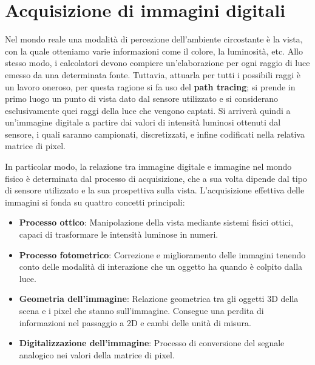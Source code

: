 \section{Acquisizione di immagini digitali}
Nel mondo reale una modalità di percezione dell'ambiente circostante è la vista, con la quale otteniamo varie informazioni come il colore, la luminosità,
etc. Allo stesso modo, i calcolatori devono compiere un'elaborazione per ogni raggio di luce emesso da una determinata fonte. Tuttavia, attuarla per
tutti i possibili raggi è un lavoro oneroso, per questa ragione si fa uso del \textbf{path tracing}; si prende in primo luogo un punto di vista dato dal
sensore utilizzato e si considerano esclusivamente quei raggi della luce che vengono captati. Si arriverà quindi a un'immagine digitale a partire dai
valori di intensità luminosi ottenuti dal sensore, i quali saranno campionati, discretizzati, e infine codificati nella relativa matrice di pixel.\par
In particolar modo, la relazione tra immagine digitale e immagine nel mondo fisico è determinata dal processo di acquisizione, che a sua volta dipende
dal tipo di sensore utilizzato e la sua prospettiva sulla vista. L'acquisizione effettiva delle immagini si fonda su quattro concetti principali:
\begin{itemize}
	\item \textbf{Processo ottico}: Manipolazione della vista mediante sistemi fisici ottici, capaci di trasformare le intensità luminose in numeri.
	\item \textbf{Processo fotometrico}: Correzione e miglioramento delle immagini tenendo conto delle modalità di interazione che un oggetto ha quando
        è colpito dalla luce.
	\item \textbf{Geometria dell'immagine}: Relazione geometrica tra gli oggetti 3D della scena e i pixel che stanno sull'immagine. Consegue una perdita
        di informazioni nel passaggio a 2D e cambi delle unità di misura.
	\item \textbf{Digitalizzazione dell'immagine}: Processo di conversione del segnale analogico nei valori della matrice di pixel.
\end{itemize}

